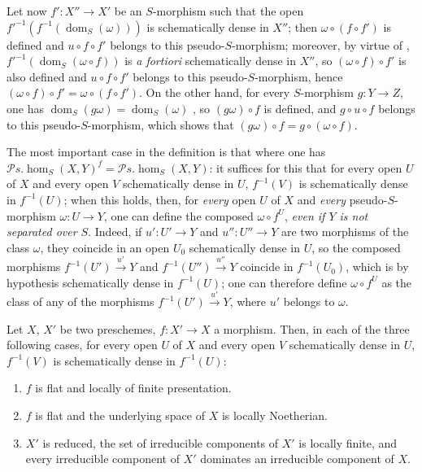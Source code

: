 \begin{env}[20.3.3]
\label{IV.20.3.3}
Let now $f':X''\to X'$ be an $S$-morphism such that the open $f'^{-1}(f^{-1}(\operatorname{dom}_S(\omega)))$ is schematically dense in $X''$;
then $\omega\circ(f\circ f')$ is defined and $u\circ f\circ f'$ belongs to this pseudo-$S$-morphism;
moreover, by virtue of , $f'^{-1}(\operatorname{dom}_S(\omega\circ f))$ is \emph{a fortiori} schematically dense in $X''$, so $(\omega\circ f)\circ f'$ is also defined and $u\circ f\circ f'$ belongs to this pseudo-$S$-morphism, hence $(\omega\circ f)\circ f'=\omega\circ(f\circ f')$.
On the other hand, for every $S$-morphism $g:Y\to Z$, one has $\operatorname{dom}_S(g\omega)=\operatorname{dom}_S(\omega)$ , so $(g\omega)\circ f$ is defined, and $g\circ u\circ f$ belongs to this pseudo-$S$-morphism, which shows that $(g\omega)\circ f=g\circ(\omega\circ f)$.
\end{env}

\begin{env}[20.3.4]
\label{IV.20.3.4}
The most important case in the definition  is that where one has $\mathscr{P}\!s.\!\operatorname{hom}_S(X,Y)^f=\mathscr{P}\!s.\!\operatorname{hom}_S(X,Y)$:
it suffices for this that for every open $U$ of $X$ and every open $V$ schematically dense in $U$, $f^{-1}(V)$ is schematically dense in $f^{-1}(U)$;
when this holds, then, for \emph{every} open $U$ of $X$ and \emph{every} pseudo-$S$-morphism $\omega:U\to Y$, one can define the composed $\omega\circ f^U$, \emph{even if $Y$ is not separated over $S$}.
Indeed, if $u':U'\to Y$ and $u'':U''\to Y$ are two morphisms of the class $\omega$, they coincide in an open $U_0$ schematically dense in $U$, so the composed morphisms $f^{-1}(U')\xrightarrow{u'}Y$ and $f^{-1}(U'')\xrightarrow{u''}Y$ coincide in $f^{-1}(U_0)$, which is by hypothesis schematically dense in $f^{-1}(U)$;
one can therefore define $\omega\circ f^U$ as the class of any of the morphisms $f^{-1}(U')\xrightarrow{u'}Y$, where $u'$ belongs to $\omega$.
\end{env}

\begin{proposition}[20.3.5]
\label{IV.20.3.5}
Let $X$, $X'$ be two preschemes, $f:X'\to X$ a morphism.
Then, in each of the three following cases, for every open $U$ of $X$ and every open $V$ schematically dense in $U$, $f^{-1}(V)$ is schematically dense in $f^{-1}(U)$:
\begin{enumerate}[label=\emph{(\roman*)}]
  \item $f$ is flat and locally of finite presentation.
  \item $f$ is flat and the underlying space of $X$ is locally Noetherian.
  \item $X'$ is reduced, the set of irreducible components of $X'$ is locally finite, and every irreducible component of $X'$ dominates an irreducible component of $X$.
\end{enumerate}
\end{proposition}

